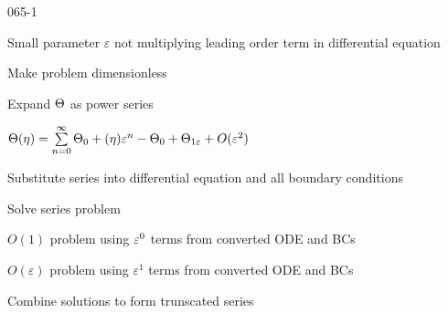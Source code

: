 \begin{mitframe}{065-1}
 \begin{listone}
	\item Small parameter $\varepsilon$
 not multiplying leading order term in differential equation 
 	\item Make problem dimensionless
    \item Expand $\dimltemp$ as power series
    	\begin{listtwo}
        	\item $\dimltemp(\intrinsvisc)=\sum\limits_{n=0}^{\infty}\dimltemp_{\init}+(\intrinsvisc)\varepsilon^{n}-\dimltemp_{\init}+\dimltemp_{1\varepsilon}+O(\varepsilon^{2})$
        \end{listtwo}
    \item Substitute series into differential equation and all boundary conditions
  	\item Solve series problem
    	\begin{listtwo}
        	\item $O(1)$ problem using $\varepsilon^{\init}$ terms from converted ODE and BCs
            \item $O(\varepsilon)$ problem using $\varepsilon^1$ terms from converted ODE and BCs
        \end{listtwo}
    \item Combine solutions to form trunscated series
 \end{listone}   
\end{mitframe}